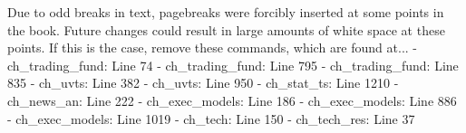Due to odd breaks in text, pagebreaks were forcibly inserted at some points in the book. Future changes could result in large amounts of white space at these points. If this is the case, remove these commands, which are found at...
- ch_trading_fund: Line 74
- ch_trading_fund: Line 795
- ch_trading_fund: Line 835
- ch_uvts: Line 382
- ch_uvts: Line 950
- ch_stat_ts: Line 1210
- ch_news_an: Line 222
- ch_exec_models: Line 186
- ch_exec_models: Line 886
- ch_exec_models: Line 1019
- ch_tech: Line 150
- ch_tech_res: Line 37